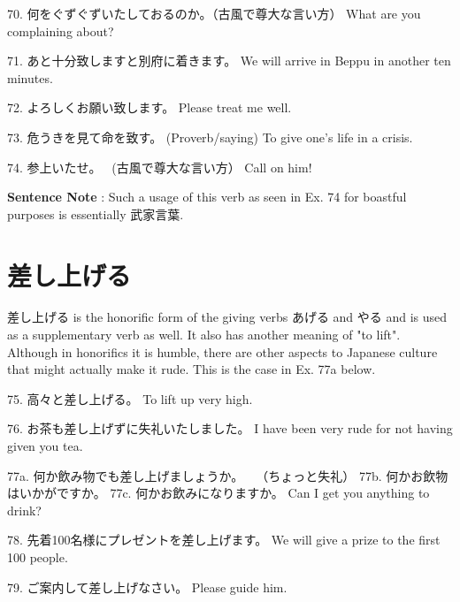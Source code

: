 \par{70. 何をぐずぐずいたしておるのか。（古風で尊大な言い方） \hfill\break
What are you complaining about? }

\par{71. あと十分致しますと別府に着きます。 \hfill\break
We will arrive in Beppu in another ten minutes. }

\par{72. よろしくお願い致します。 \hfill\break
Please treat me well. }

\par{73. 危うきを見て命を致す。 (Proverb\slash saying) \hfill\break
To give one's life in a crisis. }

\par{74. 参上いたせ。  (古風で尊大な言い方） \hfill\break
Call on him! }

\par{\textbf{Sentence Note }: Such a usage of this verb as seen in Ex. 74 for boastful purposes is essentially 武家言葉. }
      
\section{差し上げる}
 
\par{  差し上げる is the honorific form of the giving verbs あげる and やる and is used as a supplementary verb as well. It also has another meaning of "to lift". Although in honorifics it is humble, there are other aspects to Japanese culture that might actually make it rude. This is the case in Ex. 77a below. }

\par{75. 高々と差し上げる。 \hfill\break
To lift up very high. }

\par{76. お茶も差し上げずに失礼いたしました。 \hfill\break
I have been very rude for not having given you tea. }

\par{77a. 何か飲み物でも差し上げましょうか。　　（ちょっと失礼） \hfill\break
77b. 何かお飲物はいかがですか。 \hfill\break
77c. 何かお飲みになりますか。 \hfill\break
Can I get you anything to drink? }

\par{78. 先着100名様にプレゼントを差し上げます。 \hfill\break
We will give a prize to the first 100 people. }

\par{79. ご案内して差し上げなさい。 \hfill\break
Please guide him. }
      
